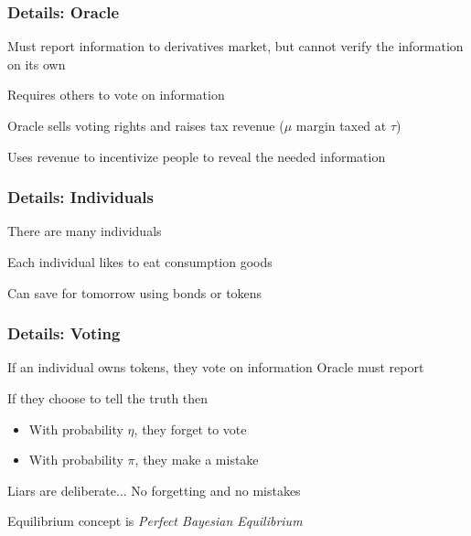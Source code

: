 \documentclass[10pt]{beamer}
\begin{document}
\begin{frame} \frametitle{Details: Oracle}

  Must report information to derivatives market, but cannot verify the
  information on its own

  Requires others to vote on information

  Oracle sells voting rights and raises tax revenue ($\mu$ margin taxed at $\tau$)

  Uses revenue to incentivize people to reveal the needed information

\end{frame}

\begin{frame} \frametitle{Details: Individuals}

  There are many individuals

  Each individual likes to eat consumption goods

  Can save for tomorrow using bonds or tokens

\end{frame}

\begin{frame} \frametitle{Details: Voting}

  If an individual owns tokens, they vote on information Oracle must report

  If they choose to tell the truth then

  \begin{itemize}
    \item With probability $\eta$, they forget to vote
    \item With probability $\pi$, they make a mistake
  \end{itemize}

  Liars are deliberate... No forgetting and no mistakes

  Equilibrium concept is \textit{Perfect Bayesian Equilibrium} 

\end{frame}
\end{document}
